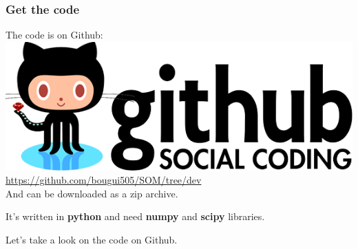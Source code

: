 \begin{frame}
    \frametitle{Get the code}
    The code is on Github:
    \includegraphics[width=.5\textwidth]{figures/github.png}\\
    \href{https://github.com/bougui505/SOM/tree/dev}{https://github.com/bougui505/SOM/tree/dev}\\
    And can be downloaded as a zip archive.

    It's written in \textbf{python} and need \textbf{numpy} and \textbf{scipy} libraries.

    Let's take a look on the code on Github.
\end{frame}
